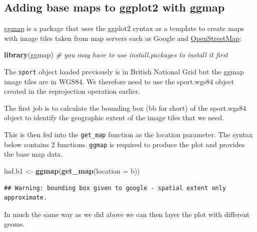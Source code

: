 \documentclass[]{article}
\newenvironment{Shaded}{}{}
\newcommand{\KeywordTok}[1]{\textcolor[rgb]{0.00,0.44,0.13}{\textbf{{#1}}}}
\newcommand{\DataTypeTok}[1]{\textcolor[rgb]{0.56,0.13,0.00}{{#1}}}
\newcommand{\DecValTok}[1]{\textcolor[rgb]{0.25,0.63,0.44}{{#1}}}
\newcommand{\FloatTok}[1]{\textcolor[rgb]{0.25,0.63,0.44}{{#1}}}
\newcommand{\CommentTok}[1]{\textcolor[rgb]{0.38,0.63,0.69}{\textit{{#1}}}}
\newcommand{\NormalTok}[1]{{#1}}
\begin{document}
\subsection{Adding base maps to ggplot2 with ggmap}

\href{http://journal.r-project.org/archive/2013-1/kahle-wickham.pdf}{ggmap}
is a package that uses the ggplot2 syntax as a template to create maps
with image tiles taken from map servers such as Google and
\href{http://www.openstreetmap.org/}{OpenStreetMap}:

\begin{Shaded}
\begin{Highlighting}[]
\KeywordTok{library}\NormalTok{(ggmap)  }\CommentTok{# you may have to use install.packages to install it first}
\end{Highlighting}
\end{Shaded}
The \texttt{sport} object loaded previously is in British National Grid
but the ggmap image tiles are in WGS84. We therefore need to use the
sport.wgs84 object created in the reprojection operation earlier.

The first job is to calculate the bounding box (bb for short) of the
sport.wgs84 object to identify the geographic extent of the image tiles
that we need.

\begin{Shaded}
\end{Shaded}
This is then fed into the \texttt{get\_map} function as the location
parameter. The syntax below contains 2 functions. \texttt{ggmap} is
required to produce the plot and provides the base map data.

\begin{Shaded}
\begin{Highlighting}[]
\NormalTok{lnd.b1 <- }\KeywordTok{ggmap}\NormalTok{(}\KeywordTok{get_map}\NormalTok{(}\DataTypeTok{location =} \NormalTok{b))}
\end{Highlighting}
\end{Shaded}
\begin{verbatim}
## Warning: bounding box given to google - spatial extent only approximate.
\end{verbatim}
In much the same way as we did above we can then layer the plot with
different geoms.
\end{document}
